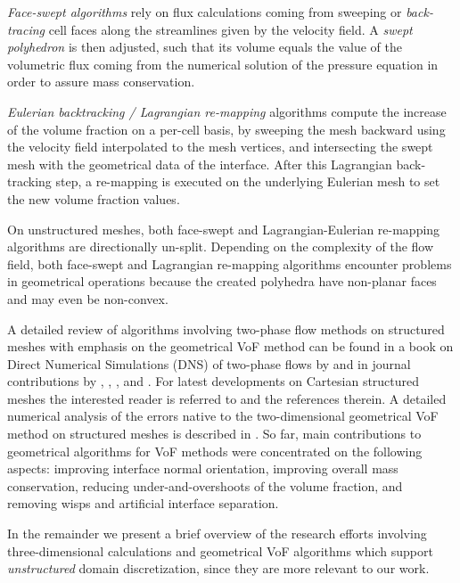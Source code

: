 \emph{Face-swept algorithms} rely on flux calculations coming from sweeping or
\emph{back-tracing} cell faces along the streamlines given by the velocity
field. A \emph{swept polyhedron} is then adjusted, such that its volume equals
the value of the volumetric flux coming from the numerical solution of the
pressure equation in order to assure mass conservation. 

\emph{Eulerian backtracking / Lagrangian re-mapping} algorithms compute the
increase of the volume fraction on a per-cell basis, by sweeping the mesh
backward using the velocity field interpolated to the mesh vertices, and
intersecting the swept mesh with the geometrical data of the interface. After
this Lagrangian back-tracking step, a re-mapping is executed on the underlying
Eulerian mesh to set the new volume fraction values.

On unstructured meshes, both face-swept and Lagrangian-Eulerian re-mapping
algorithms are directionally un-split. Depending on the complexity of the flow
field, both face-swept and Lagrangian re-mapping algorithms encounter problems in
geometrical operations because the created polyhedra have non-planar faces and
may even be non-convex.  

A detailed review of algorithms involving two-phase flow methods on structured
meshes with emphasis on the geometrical VoF method can be found in a book on
Direct Numerical Simulations (DNS) of two-phase flows by
\citet*{Tryggvason2011direct} and in journal contributions by
\citet{RiderReconstructing1998}, \citet{ScardovelliReview1999},
\citet{ScardovelliZaleskiEILE2003}, and \citet{Aulisa2007}. For latest 
developments on Cartesian structured meshes the interested reader is 
referred to \citep{WeymouthYue2010,MencingerZunAdaptive2011,LeChenadec2013} and 
the references therein. %
A detailed numerical analysis of the errors native to the two-dimensional 
geometrical VoF method on structured meshes is described in \citet{Cerne2002}. 
So far, main contributions to geometrical algorithms for VoF methods were 
concentrated on the following aspects: improving interface normal orientation, 
improving overall mass conservation, reducing under-and-overshoots of the volume 
fraction, and removing wisps and artificial interface separation. 

In the remainder we present a brief overview of the research efforts involving 
three-dimensional calculations and geometrical VoF algorithms which support 
\emph{unstructured} domain discretization, since they are more relevant to our work. 

